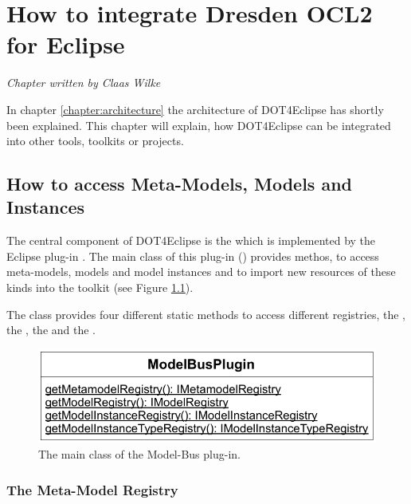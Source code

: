 \chapter{How to integrate Dresden OCL2 for Eclipse}
\label{chapter:integration}

\begin{flushright}
\textit{Chapter written by Claas Wilke}
\end{flushright}

In chapter \ref{chapter:architecture} the architecture of \acl{DOT4Eclipse} has shortly been explained. This chapter will explain, how \acl{DOT4Eclipse} can be integrated into other tools, toolkits or projects.



\section{How to access Meta-Models, Models and Instances}

The central component of \acl{DOT4Eclipse} is the  which is implemented by the Eclipse plug-in . The main class of this plug-in () provides methos, to access meta-models, models and model instances and to import new resources of these kinds into the toolkit (see Figure \ref{pic:integration:modelBusPlugin}).

The class provides four different static methods to access different registries, the , the , the  and the .

\begin{figure}[!b]
	\centering
	\includegraphics[width=.8\linewidth]{figures/integration/modelBusPlugin}
	\caption{The main class of the Model-Bus plug-in.}
	\label{pic:integration:modelBusPlugin}
\end{figure}


\subsection{The Meta-Model Registry}

